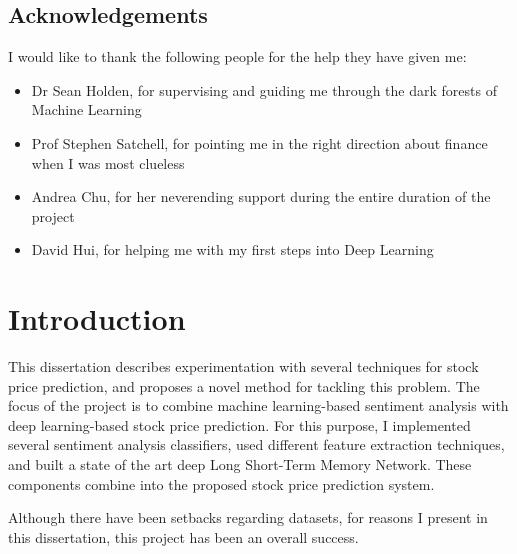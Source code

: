 \documentclass[12pt,a4paper,twoside,openright]{report}
\begin{document}
\bigskip
{}

\medskip
{}

\tableofcontents

{\listoffigures \let\cleardoublepage\clearpage \listoftables}

\newpage
\section*{Acknowledgements}

I would like to thank the following people for the help they have given me:

\begin{itemize}
\item
Dr Sean Holden, for supervising and guiding me through the dark forests of Machine Learning

\item
Prof Stephen Satchell, for pointing me in the right direction about finance when I was most clueless

\item
Andrea Chu, for her neverending support during the entire duration of the project

\item
David Hui, for helping me with my first steps into Deep Learning
\end{itemize}


\pagestyle{headings}

\chapter{Introduction}


This dissertation describes experimentation with several
techniques for stock price prediction, and proposes a novel method for tackling this problem.
The focus of the project is to combine machine learning-based sentiment analysis with deep learning-based 
stock price prediction. For this purpose, I implemented several sentiment analysis classifiers,
used different feature extraction techniques, and built a state of the art deep Long Short-Term Memory Network. 
These components combine into the proposed stock price prediction system.

Although there have been setbacks regarding datasets, for reasons I present in this dissertation,
this project has been an overall success.
\end{document}
